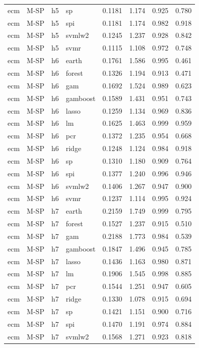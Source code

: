 \begin{ThreePartTable}
\begin{longtable}[t]{llclcccc}
ecm & M-SP & h5 & sp & 0.1181 & 1.174 & 0.925 & 0.780\\
ecm & M-SP & h5 & spi & 0.1181 & 1.174 & 0.982 & 0.918\\
ecm & M-SP & h5 & svmlw2 & 0.1245 & 1.237 & 0.928 & 0.842\\
ecm & M-SP & h5 & svmr & 0.1115 & 1.108 & 0.972 & 0.748\\
\addlinespace
ecm & M-SP & h6 & earth & 0.1761 & 1.586 & 0.995 & 0.461\\
ecm & M-SP & h6 & forest & 0.1326 & 1.194 & 0.913 & 0.471\\
ecm & M-SP & h6 & gam & 0.1692 & 1.524 & 0.989 & 0.623\\
ecm & M-SP & h6 & gamboost & 0.1589 & 1.431 & 0.951 & 0.743\\
ecm & M-SP & h6 & lasso & 0.1259 & 1.134 & 0.969 & 0.836\\
ecm & M-SP & h6 & lm & 0.1625 & 1.463 & 0.999 & 0.959\\
ecm & M-SP & h6 & pcr & 0.1372 & 1.235 & 0.954 & 0.668\\
ecm & M-SP & h6 & ridge & 0.1248 & 1.124 & 0.984 & 0.918\\
ecm & M-SP & h6 & sp & 0.1310 & 1.180 & 0.909 & 0.764\\
ecm & M-SP & h6 & spi & 0.1377 & 1.240 & 0.996 & 0.946\\
ecm & M-SP & h6 & svmlw2 & 0.1406 & 1.267 & 0.947 & 0.900\\
ecm & M-SP & h6 & svmr & 0.1237 & 1.114 & 0.995 & 0.924\\
\addlinespace
ecm & M-SP & h7 & earth & 0.2159 & 1.749 & 0.999 & 0.795\\
ecm & M-SP & h7 & forest & 0.1527 & 1.237 & 0.915 & 0.510\\
ecm & M-SP & h7 & gam & 0.2188 & 1.773 & 0.984 & 0.539\\
ecm & M-SP & h7 & gamboost & 0.1847 & 1.496 & 0.945 & 0.785\\
ecm & M-SP & h7 & lasso & 0.1436 & 1.163 & 0.980 & 0.871\\
ecm & M-SP & h7 & lm & 0.1906 & 1.545 & 0.998 & 0.885\\
ecm & M-SP & h7 & pcr & 0.1544 & 1.251 & 0.947 & 0.605\\
ecm & M-SP & h7 & ridge & 0.1330 & 1.078 & 0.915 & 0.694\\
ecm & M-SP & h7 & sp & 0.1421 & 1.151 & 0.900 & 0.716\\
ecm & M-SP & h7 & spi & 0.1470 & 1.191 & 0.974 & 0.884\\
ecm & M-SP & h7 & svmlw2 & 0.1568 & 1.271 & 0.923 & 0.818\\

\end{longtable}
\end{ThreePartTable}
